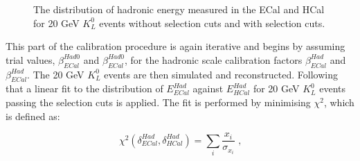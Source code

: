 \begin{figure}[h!]
\caption[The distribution of hadronic energy measured in the ECal and HCal for 20 GeV $K^{0}_{L}$ events with and without selection cuts.]{The distribution of hadronic energy measured in the ECal and HCal for 20 GeV $K^{0}_{L}$ events \protect{} without selection cuts and \protect{} with selection cuts.}
\label{fig:hadscaleselection}
\end{figure}

This part of the calibration procedure is again iterative and begins by assuming trial values, $\beta^{Had0}_{ECal}$ and $\beta^{Had0}_{ECal}$, for the hadronic scale calibration factors $\beta^{Had}_{ECal}$ and $\beta^{Had}_{ECal}$.  The 20 GeV $K^{0}_{L}$ events are then simulated and reconstructed.  Following that a linear fit to the distribution of $E^{Had}_{ECal}$ against $E^{Had}_{HCal}$ for 20 GeV $K^{0}_{L}$ events passing the selection cuts is applied.  The fit is performed by minimising $\chi^{2}$, which is defined as:

\begin{equation}
\chi^{2}(\delta^{Had}_{ECal}, \delta^{Had}_{HCal}) = \sum_{i} \frac{x_{i}}{\sigma_{x_{i}}}\text{ ,}
\end{equation}

